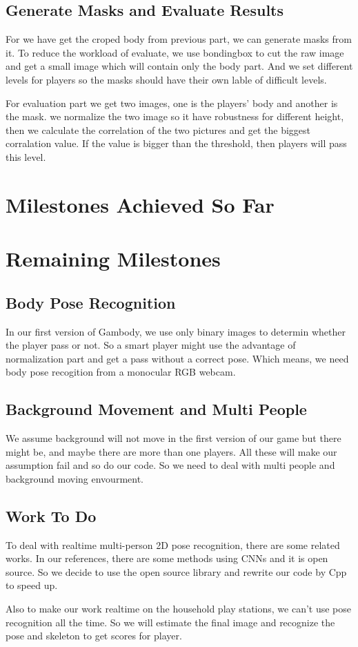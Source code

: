 \documentclass[conference,compsoc]{IEEEtran}
\begin{document}
\subsection{Generate Masks and Evaluate Results}
For we have get the croped body from previous part, we can generate masks from it. To reduce the workload of evaluate, we use bondingbox to cut the raw image and get a small image which will contain only the body part.
And we set different levels for players so the masks should have their own lable of difficult levels.\par
For evaluation part we get two images, one is the players' body and another is the mask. we normalize the two image so it have robustness for different height, then we calculate the correlation of the two pictures and get the biggest corralation value. If the value is bigger than the threshold, then players will pass this level.\par
\section{Milestones Achieved So Far}
\section{Remaining Milestones}
\subsection{Body Pose Recognition}
In our first version of Gambody, we use only binary images to determin whether the player pass or not. So a smart player might use the advantage of normalization part and get a pass without a correct pose. Which means, we need body pose recogition from a monocular RGB webcam.\par
\subsection{Background Movement and Multi People}
We assume background will not move in the first version of our game but there might be, and maybe there  are more than one players. All these will make our assumption fail and so do our code. So we need to deal with multi people and background moving envourment.\par
\subsection{Work To Do}
To deal with realtime multi-person 2D pose recognition, there are some related works. In our references, there are some methods using CNNs and it is open source. So we decide to use the open source library and rewrite our code by Cpp to speed up.\par
Also to make our work realtime on the household play stations, we can't use pose recognition all the time. So we will estimate the final image and recognize the pose and skeleton to get scores for player.


% 
% 
\end{document}
